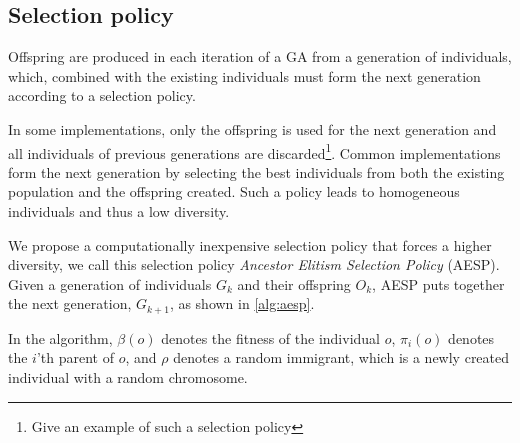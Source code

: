\subsection{Selection policy}
Offspring are produced in each iteration of a GA from a generation of individuals, which, combined with the existing individuals must form the next generation according to a selection policy.

In some implementations, only the offspring is used for the next generation and all individuals of previous generations are discarded\footnote{ Give an example of such a selection policy}. Common implementations form the next generation by selecting the best individuals from both the existing population and the offspring created\cite{masterThesisGANN}. Such a policy leads to homogeneous individuals and thus a low diversity.

We propose a computationally inexpensive selection policy that forces a higher diversity, we call this selection policy \emph{Ancestor Elitism Selection Policy} (AESP). Given a generation of individuals $G_k$ and their offspring $O_k$, AESP puts together the next generation, $G_{k+1}$, as shown in \cref{alg:aesp}.
%

%
In the algorithm, $\beta(o)$ denotes the fitness of the individual $o$, $\pi_i(o)$ denotes the $i$'th parent of $o$, and $\rho$ denotes a random immigrant, which is a newly created individual with a random chromosome.
